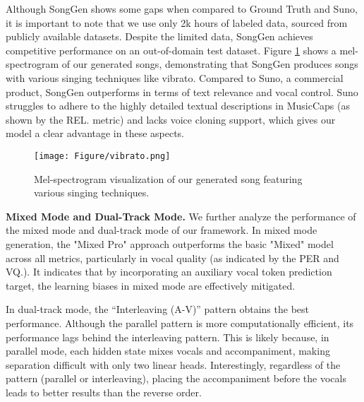 Although SongGen shows some gaps when compared to Ground Truth and Suno, it is important to note that we use only 2k hours of labeled data, sourced from publicly available datasets. Despite the limited data, SongGen achieves competitive performance on an out-of-domain test dataset. Figure \ref{fig:vibrato} shows a mel-spectrogram of our generated songs, demonstrating that SongGen produces songs with various singing techniques like vibrato. Compared to Suno, a commercial product, SongGen outperforms in terms of text relevance and vocal control. Suno struggles to adhere to the highly detailed textual descriptions in MusicCaps (as shown by the REL. metric) and lacks voice cloning support, which gives our model a clear advantage in these aspects.

\begin{figure}[tb!]
	\centering
	\texttt{[image: Figure/vibrato.png]}
    \vspace{-15pt}
	\caption{Mel-spectrogram visualization of our generated song featuring various singing techniques. }
	\label{fig:vibrato}
    \vspace{-18pt}
\end{figure}




\textbf{Mixed Mode and Dual-Track Mode.}
We further analyze the performance of the mixed mode and dual-track mode of our framework. 
In mixed mode generation, the "Mixed Pro" approach outperforms the basic "Mixed" model across all metrics, particularly in vocal quality (as indicated by the PER and VQ.).
It indicates that by incorporating an auxiliary vocal token prediction target, the learning biases in mixed mode are effectively mitigated.

 In dual-track mode, the ``Interleaving (A-V)” pattern obtains the best performance.
 Although the parallel pattern is more computationally efficient, its performance lags behind the interleaving pattern. This is likely because, in parallel mode, each hidden state mixes vocals and accompaniment, making separation difficult with only two linear heads. 
 Interestingly, regardless of the pattern (parallel or interleaving), placing the accompaniment before the vocals leads to better results than the reverse order.






